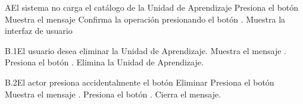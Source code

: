 
\begin{comment}
\begin{UCtrayectoriaA}{A}{El sistema no encuentra ningún formulario para mostrar.}
	\UCpaso No encuentra ningún formulario para mostrar.
    \UCpaso El sistema muestra el mensaje \MSGref{MSG6}{Por el momento no se puede registrar la bibliografía}.
    \UCpaso[\UCactor] Cierra el mensaje presionando el botón \IUbutton{Aceptar}.
    \UCpaso Continua en el paso 1 de la trayectoria principal del \UCref{CU1}.
\end{UCtrayectoriaA}
\end{comment}


\begin{UCtrayectoriaA}{A}{El sistema no carga el catálogo de la Unidad de Aprendizaje}
	\UCpaso[\UCactor] Presiona el botón 
	\UCpaso Muestra el mensaje 
	\UCpaso[\UCactor] Confirma la operación presionando el botón .
	 \UCpaso Muestra la interfaz de usuario 

\end{UCtrayectoriaA}





\begin{UCtrayectoriaA}{B.1}{El usuario desea eliminar la Unidad de Aprendizaje.}
	\UCpaso  Muestra el mensaje .
	\UCpaso[\UCactor] Presiona el botón .
	\UCpaso Elimina la Unidad de Aprendizaje.
\end{UCtrayectoriaA}



\begin{UCtrayectoriaA}{B.2}{El actor presiona accidentalmente el botón Eliminar}
	\UCpaso[\UCactor] Presiona el botón 
	\UCpaso Muestra el mensaje .
	\UCpaso[\UCactor] Presiona el botón .
	\UCpaso Cierra el mensaje.
	
\end{UCtrayectoriaA}

